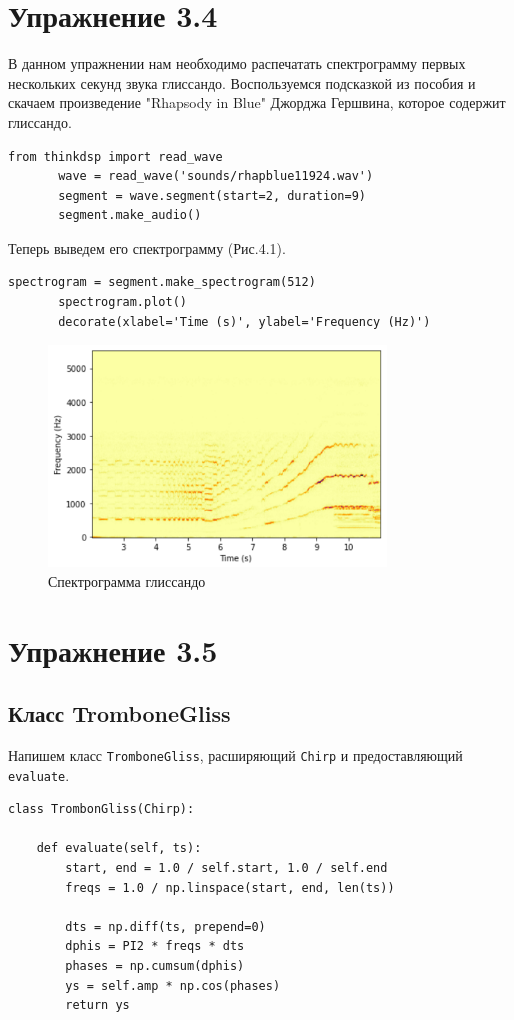 \documentclass[a4paper,12pt]{report}
\begin{document}
\chapter{Упражнение 3.4}
    В данном упражнении нам необходимо распечатать спектрограмму первых нескольких секунд звука глиссандо. Воспользуемся подсказкой из пособия и скачаем произведение "Rhapsody in Blue" Джорджа Гершвина, которое содержит глиссандо.
\begin{lstlisting}[caption=Получение звука глиссандо]
       from thinkdsp import read_wave
       wave = read_wave('sounds/rhapblue11924.wav')
       segment = wave.segment(start=2, duration=9)
       segment.make_audio()
\end{lstlisting}
    Теперь выведем его спектрограмму (Рис.4.1).
\begin{lstlisting}[caption=Получение спектрограммы]
       spectrogram = segment.make_spectrogram(512)
       spectrogram.plot()
       decorate(xlabel='Time (s)', ylabel='Frequency (Hz)')
\end{lstlisting}
\begin{figure}[H]
        \centering
        \includegraphics[width=0.8\textwidth]{fig4-1.PNG}
        \caption{Спектрограмма глиссандо}
        \label{fig:fig4-1}
\end{figure}

\chapter{Упражнение 3.5}
\section{Класс TromboneGliss}
    Напишем класс \texttt{TromboneGliss}, расширяющий \texttt{Chirp} и предоставляющий \texttt{evaluate}.
\begin{lstlisting}[caption=Класс TromboneCliss]
class TrombonGliss(Chirp):
    
    def evaluate(self, ts):
        start, end = 1.0 / self.start, 1.0 / self.end
        freqs = 1.0 / np.linspace(start, end, len(ts))
        
        dts = np.diff(ts, prepend=0)
        dphis = PI2 * freqs * dts
        phases = np.cumsum(dphis)
        ys = self.amp * np.cos(phases)
        return ys
\end{lstlisting}
    
\end{document}
